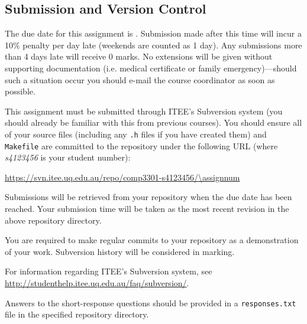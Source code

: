 \subsection*{Submission and Version Control}

The due date for this assignment is \textbf{\duedate}. Submission made after
this time will incur a 10\% penalty per day late (weekends are counted as 1
day). Any submissions more than 4 days late will receive 0 marks. No extensions 
will be given without supporting documentation (i.e.  medical certificate or
family emergency)---should such a situation occur you should e-mail the course
coordinator as soon as possible.

This assignment must be submitted through ITEE's Subversion system (you should
already be familiar with this from previous courses). You should ensure all of
your source files (including any \texttt{.h} files if you have created them)
and \texttt{Makefile} are committed to the repository under the following URL
(where \textit{s4123456} is your student number):

\url{https://svn.itee.uq.edu.au/repo/comp3301-s4123456/\assignnum}

Submissions will be retrieved from your repository when the due date has been
reached.  Your submission time will be taken as the most recent revision in the 
above repository directory.

You are required to make regular commits to your repository as a demonstration
of your work. Subversion history will be considered in marking.

For information regarding ITEE's Subversion system, see
\url{http://studenthelp.itee.uq.edu.au/faq/subversion/}.

Answers to the short-response questions should be provided in a \texttt{responses.txt}
file in the specified repository directory.
